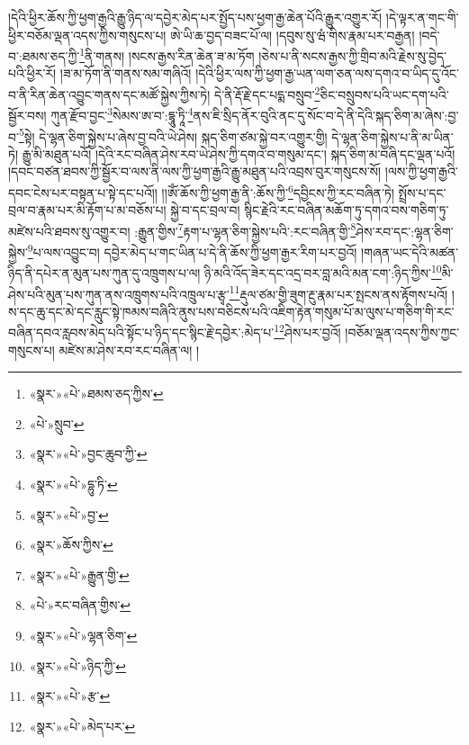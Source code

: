 །དེའི་ཕྱིར་ཆོས་ཀྱི་ཕྱག་རྒྱའི་རྒྱུ་ཉིད་ལ་དབྱེར་མེད་པར་སྤྱོད་པས་ཕྱག་རྒྱ་ཆེན་པོའི་རྒྱུར་འགྱུར་རོ། །དེ་ལྟར་ན་གང་གི་ཕྱིར་བཅོམ་ལྡན་འདས་ཀྱིས་གསུངས་པ། ཨེ་ཡི་ཆ་བྱད་བཟང་པོ་ལ། །དབུས་སུ་ཝཾ་གིས་རྣམ་པར་བརྒྱན། །བདེ་བ་:ཐམས་ཅད་ཀྱི་\footnote{«སྣར་»«པེ་»ཐམས་ཅད་ཀྱིས་}ནི་གནས། །སངས་རྒྱས་རིན་ཆེན་ཟ་མ་ཏོག །ཅེས་པ་ནི་སངས་རྒྱས་ཀྱི་གྲིབ་མའི་རྗེས་སུ་བྱེད་པའི་ཕྱིར་རོ། །ཟ་མ་ཏོག་ནི་གནས་སམ་གཞིའོ། །དེའི་ཕྱིར་ལས་ཀྱི་ཕྱག་རྒྱ་ཡན་ལག་ཅན་ལས་དགའ་བ་ཡིད་དུ་འོང་བ་ནི་རིན་ཆེན་འབྱུང་གནས་དང་མཚོ་སྐྱེས་ཀྱིས་ཏེ། དེ་ནི་རྡོ་རྗེ་དང་པདྨ་བསྲུབ་\footnote{«པེ་»སྲུབ་}ཅིང་བསྲུབས་པའི་ཡང་དག་པའི་སྦྱོར་བས། ཀུན་རྫོབ་བྱང་\footnote{«སྣར་»«པེ་»བྱང་ཆུབ་ཀྱི་}སེམས་ཨ་བ་:དྷཱུ་ཏཱི་\footnote{«སྣར་»«པེ་»དྷུ་ཏི་}ནས་ཇི་སྲིད་ནོར་བུའི་ནང་དུ་སོང་བ་དེ་ནི་དེའི་སྐད་ཅིག་མ་ཞེས་:བྱ་བ་\footnote{«སྣར་»«པེ་»བྱ་}སྟེ། དེ་ལྷན་ཅིག་སྐྱེས་པ་ཞེས་བྱ་བའི་ཡེ་ཤེས། སྐད་ཅིག་ཙམ་སྐྱེ་བར་འགྱུར་གྱི། དེ་ལྷན་ཅིག་སྐྱེས་པ་ནི་མ་ཡིན་ཏེ། རྒྱུ་མི་མཐུན་པའོ། །དེའི་རང་བཞིན་ཤེས་རབ་ཡེ་ཤེས་ཀྱི་དགའ་བ་གསུམ་དང་། སྐད་ཅིག་མ་བཞི་དང་ལྡན་པའོ། །དབང་བཙན་ཐབས་ཀྱི་སྦྱོར་བ་ལས་ནི་ལས་ཀྱི་ཕྱག་རྒྱའི་རྒྱུ་མཐུན་པའི་འབྲས་བུར་གསུངས་སོ། །ལས་ཀྱི་ཕྱག་རྒྱའི་དབང་ངེས་པར་བསྟན་པ་སྟེ་དང་པའོ།། །།ཨོཾ་ཆོས་ཀྱི་ཕྱག་རྒྱ་ནི་:ཆོས་ཀྱི་\footnote{«སྣར་»ཆོས་ཀྱིས་}དབྱིངས་ཀྱི་རང་བཞིན་ཏེ། སྤྲོས་པ་དང་བྲལ་བ་རྣམ་པར་མི་རྟོག་པ་མ་བཅོས་པ། སྐྱེ་བ་དང་བྲལ་བ། སྙིང་རྗེའི་རང་བཞིན་མཆོག་ཏུ་དགའ་བས་གཅིག་ཏུ་མཛེས་པའི་ཐབས་སུ་འགྱུར་བ། :རྒྱུན་གྱིས་\footnote{«སྣར་»«པེ་»རྒྱུན་གྱི་}རྟག་པ་ལྷན་ཅིག་སྐྱེས་པའི་:རང་བཞིན་གྱི་\footnote{«པེ་»རང་བཞིན་གྱིས་}ཤེས་རབ་དང་:ལྷན་ཅིག་སྐྱེས་\footnote{«སྣར་»«པེ་»ལྷན་ཅིག་}པ་ལས་འབྱུང་བ། དབྱེར་མེད་པ་གང་ཡིན་པ་དེ་ནི་ཆོས་ཀྱི་ཕྱག་རྒྱར་རིག་པར་བྱའོ། །གཞན་ཡང་དེའི་མཚན་ཉིད་ནི་དཔེར་ན་མུན་པས་ཀུན་དུ་འཁྲུགས་པ་ལ། ཉི་མའི་འོད་ཟེར་དང་འདྲ་བར་བླ་མའི་མན་ངག་:ཉིད་ཀྱིས་\footnote{«སྣར་»«པེ་»ཉིད་ཀྱི་}མི་ཤེས་པའི་མུན་པས་ཀུན་ནས་འཁྲུགས་པའི་འཁྲུལ་པ་རྩྭ་\footnote{«སྣར་»«པེ་»རྩ་}རྡུལ་ཙམ་གྱི་ཟུག་རྔུ་རྣམ་པར་སྤངས་ནས་རྟོགས་པའོ། །ས་དང་ཆུ་དང་མེ་དང་རླུང་སྟེ་ཁམས་བཞིའི་ནུས་པས་བཅིངས་པའི་འཇིག་རྟེན་གསུམ་པོ་མ་ལུས་པ་གཅིག་གི་རང་བཞིན་དབའ་རླབས་མེད་པའི་སྟོང་པ་ཉིད་དང་སྙིང་རྗེ་དབྱེར་:མེད་པ་\footnote{«སྣར་»«པེ་»མེད་པར་}ཤེས་པར་བྱའོ། །བཅོམ་ལྡན་འདས་ཀྱིས་ཀྱང་གསུངས་པ། མཛེས་མ་ཤེས་རབ་རང་བཞིན་ལ། །
